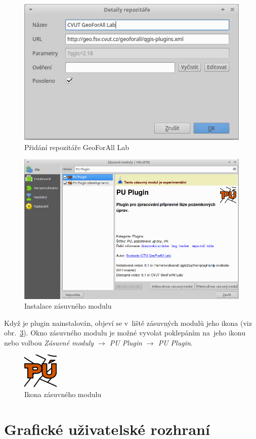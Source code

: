 	\begin{figure}[H]
		\centering
		\includegraphics[width=.5\textwidth]{./pictures/pridani_repozitare-geoforall_lab.png}
		\caption[Přidání repozitáře GeoForAll Lab]{Přidání repozitáře GeoForAll Lab}
		\label{fig:pridani_repozitare_geoforall_lab}
 	\end{figure}

	\begin{figure}[H]
		\centering
		\includegraphics[width=.6\textwidth]{./pictures/instalace_puplugin.png}
		\caption[Instalace zásuvného modulu]{Instalace zásuvného modulu}
		\label{fig:instalace_puplugin}
 	\end{figure}

Když je plugin nainstalován, objeví se v~liště zásuvných modulů jeho ikona (viz obr.~\ref{fig:ikona_puplugin}). Okno zásuvného modulu je možné vyvolat poklepáním na~jeho ikonu nebo volbou \textit{Zásuvné moduly $\rightarrow$ PU Plugin $\rightarrow$ PU Plugin}.

	\begin{figure}[H]
		\centering
		\includegraphics[width=.1\textwidth]{./pictures/puplugin.png}
		\caption[Ikona zásuvného modulu]{Ikona zásuvného modulu}
		\label{fig:ikona_puplugin}
 	\end{figure}

\section{Grafické uživatelské rozhraní}
\label{gui}


